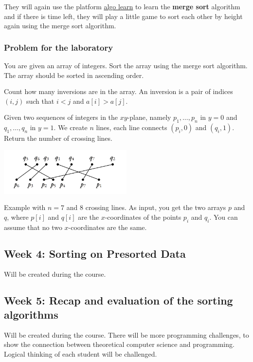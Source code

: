 \documentclass[10pt, oneside]{article}
\theoremstyle{remark}
\begin{document}
They will again use the platform \href{https://tcs.uni-frankfurt.de/algo-learn-testing/refs_heads_feat-bubbleSort/en
}{algo learn} to learn the \textbf{merge sort} algorithm and if there is time left, they will play a little game to sort each other by height again using the merge sort algorithm.

\subsubsection*{Problem for the laboratory}
\begin{tcolorbox}
  You are given an array of integers. Sort the array using the merge sort algorithm. The array should be sorted in ascending order. 

  \vspace{1em}
  
  Count how many inversions are in the array. An inversion is a pair of indices $(i, j)$ such that $i < j$ and $a[i] > a[j]$.

  \vspace{1em}

  Given two sequences of integers in the $xy$-plane, namely $p_1, \dots, p_n$ in $y=0$ and $q_1, \dots, q_n$ in $y=1$. We create $n$ lines, each line connects $(p_i, 0)$ and $(q_i, 1)$. Return the number of crossing lines.
  \begin{center}
    \includegraphics[width=0.5\textwidth]{MergeSortProblem.png}
  \end{center}
  Example with $n=7$ and $8$ crossing lines. As input, you get the two arrays $p$ and $q$, where $p[i]$ and $q[i]$ are the $x$-coordinates of the points $p_i$ and $q_i$. You can assume that no two $x$-coordinates are the same.
    

\end{tcolorbox}

\subsection{Week 4: Sorting on Presorted Data}
Will be created during the course.

\subsection{Week 5: Recap and evaluation of the sorting algorithms}
Will be created during the course. There will be more programming challenges, to show the connection between theoretical computer science and programming. Logical thinking of each student will be challenged.
\end{document}
